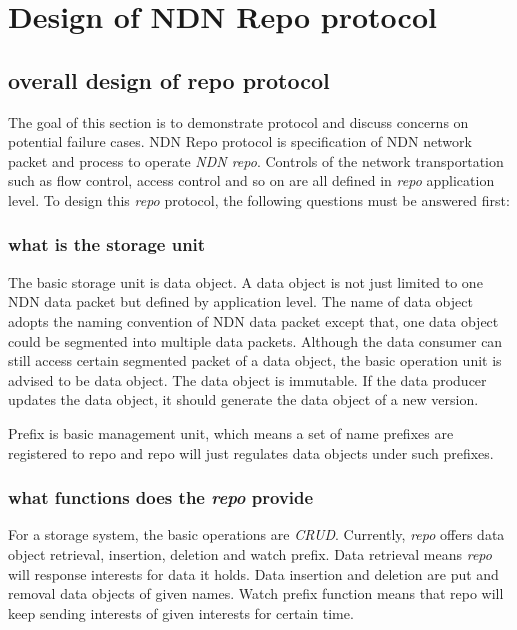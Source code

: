 \documentclass[conference]{IEEEtran}
\begin{document}
\section{Design of NDN Repo protocol} \label{section-design}

\subsection{overall design of repo protocol}

The goal of this section is to demonstrate protocol and discuss concerns on potential failure cases. NDN Repo protocol is specification of NDN network packet and process to operate \emph{NDN repo}. Controls of the network transportation such as flow control, access control and so on are all defined in \emph{repo} application level. To design this \emph{repo} protocol, the following questions must be answered first:

\subsubsection{what is the storage unit}

The basic storage unit is data object. A data object is not just limited to one NDN data packet but defined by application level. The name of data object adopts the naming convention of NDN data packet except that, one data object could be segmented into multiple data packets. Although the data consumer can still access certain segmented packet of a data object, the basic operation unit is advised to be data object. The data object is immutable. If the data producer updates the data object, it should generate the data object of a new version.

Prefix is basic management unit, which means a set of name prefixes are registered to repo and repo will just regulates data objects under such prefixes.

\subsubsection{what functions does the \emph{repo} provide}

For a storage system, the basic operations are \emph{CRUD}. Currently, \emph{repo} offers data object retrieval, insertion, deletion and watch prefix. Data retrieval means \emph{repo} will response interests for data it holds. Data insertion and deletion are put and removal data objects of given names. Watch prefix function means that repo will keep sending interests of given interests for certain time.
\end{document}
